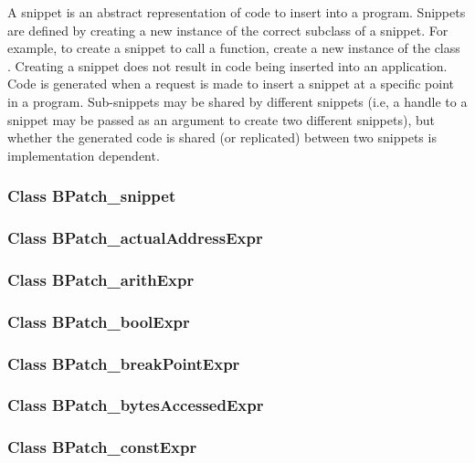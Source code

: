 A snippet is an abstract representation of code to insert into a
program. Snippets are defined by creating a new instance of the
correct subclass of a snippet. For example, to create
a snippet to call a function, create a new instance of the class
. Creating a snippet does
not result in code being inserted into an application. Code is
generated when a request is made to insert a
snippet at a specific point in a program. Sub-snippets may be shared
by different snippets (i.e, a handle to a
snippet may be passed as an argument to create two different
snippets), but whether the generated code is shared (or
replicated) between two snippets is implementation dependent.

\subsubsection{Class BPatch\_snippet}


\subsubsection{Class BPatch\_actualAddressExpr}


\subsubsection{Class BPatch\_arithExpr}


\subsubsection{Class BPatch\_boolExpr}


\subsubsection{Class BPatch\_breakPointExpr}


\subsubsection{Class BPatch\_bytesAccessedExpr}


\subsubsection{Class BPatch\_constExpr}


